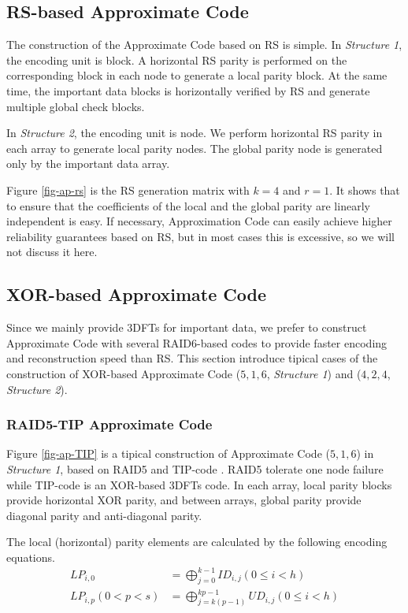 \documentclass[sigconf]{acmart}
\begin{document}
\subsection{RS-based Approximate Code}
The construction of the Approximate Code based on RS is simple. In \emph{Structure 1}, the encoding unit is block. A horizontal RS parity is performed on the corresponding block in each node to generate a local parity block. At the same time, the important data blocks is horizontally verified by RS and generate multiple global check blocks.

In \emph{Structure 2}, the encoding unit is node.
We perform horizontal RS parity in each array to generate local parity nodes. The global parity node is generated only by the important data array.

Figure \ref{fig-ap-rs} is the RS generation matrix with $k=4$ and $r=1$.
It shows that to ensure that the coefficients of the local and the global parity are linearly independent is easy. If necessary, Approximation Code can easily achieve higher reliability guarantees based on RS, but in most cases this is excessive, so we will not discuss it here.

\subsection{XOR-based Approximate Code}
Since we mainly provide 3DFTs for important data, we prefer to construct Approximate Code with several RAID6-based codes to provide faster encoding and reconstruction speed than RS. This section introduce tipical cases of the construction of XOR-based Approximate Code ($5,1,6$, \emph{Structure 1}) and ($4,2,4$, \emph{Structure 2}).


\subsubsection{RAID5-TIP Approximate Code}


Figure \ref{fig-ap-TIP} is a tipical construction of Approximate Code ($5,1,6$) in \emph{Structure 1}, based on RAID5 and TIP-code \cite{zhang2015tip}. RAID5 tolerate one node failure while TIP-code is an XOR-based 3DFTs code. In each array, local parity blocks provide horizontal XOR parity, and between arrays, global parity provide diagonal parity and anti-diagonal parity. 

The local (horizontal) parity elements are calculated by the following encoding equations.
\begin{align}
    LP_{i,0} &= \bigoplus_{j=0}^{k-1} ID_{i,j} (0 \leqslant i < h)\\
    LP_{i,p}(0<p<s) &= \bigoplus_{j=k(p-1)}^{kp-1} UD_{i,j} (0 \leqslant i < h)
\end{align}
\end{document}

